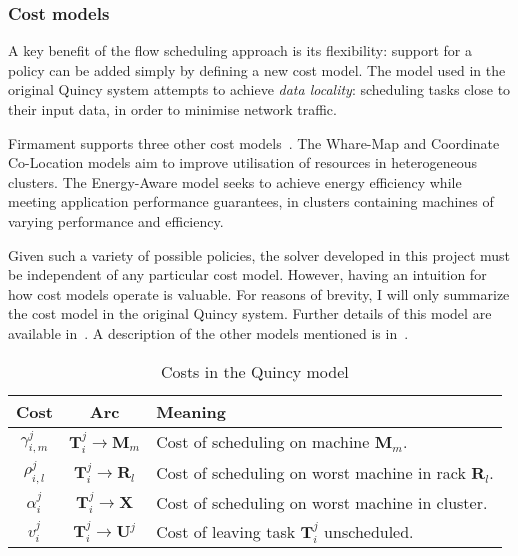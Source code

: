 \subsubsection{Cost models}  


A key benefit of the flow scheduling approach is its flexibility: support for a policy can be added simply by defining a new cost model. The model used in the original Quincy system attempts to achieve \emph{data locality}: scheduling tasks close to their input data, in order to minimise network traffic. 

Firmament supports three other cost models~\cite[ch.~5]{Schwarzkopf:2015}. The Whare-Map and Coordinate Co-Location models aim to improve utilisation of resources in heterogeneous clusters. The Energy-Aware model seeks to achieve energy efficiency while meeting application performance guarantees, in clusters containing machines of varying performance and efficiency.

Given such a variety of possible policies, the solver developed in this project must be independent of any particular cost model. However, having an intuition for how cost models operate is valuable. For reasons of brevity, I will only summarize the cost model in the original Quincy system. Further details of this model are available in~\cite{Isard:2009}. A description of the other models mentioned is in~\cite[ch.~5]{Schwarzkopf:2015}.

\begin{table}
    \centering
    \begin{tabular}{ccl}
        \textbf{Cost} & \textbf{Arc} & \textbf{Meaning}\tabularnewline
        \hline 
        $\gamma_{i,m}^{j}$ & $\mathbf{T}_{i}^{j}\to\mathbf{M}_{m}$ & Cost of scheduling on machine $\mathbf{M}_{m}$.\tabularnewline
        $\rho_{i,l}^{j}$ & $\mathbf{T}_{i}^{j}\to\mathbf{R}_{l}$ & Cost of scheduling on worst machine in rack $\mathbf{R}_{l}$.\tabularnewline
        $\alpha_{i}^{j}$ & $\mathbf{T}_{i}^{j}\to\mathbf{X}$ & Cost of scheduling on worst machine in cluster.\tabularnewline
        $v_{i}^{j}$ & $\mathbf{T}_{i}^{j}\to\mathbf{U}^{j}$ & Cost of leaving task $\mathbf{T}_{i}^{j}$ unscheduled.\tabularnewline
    \end{tabular}
    \caption{Costs in the Quincy model}
    \label{table:quincy-costs}
\end{table}

